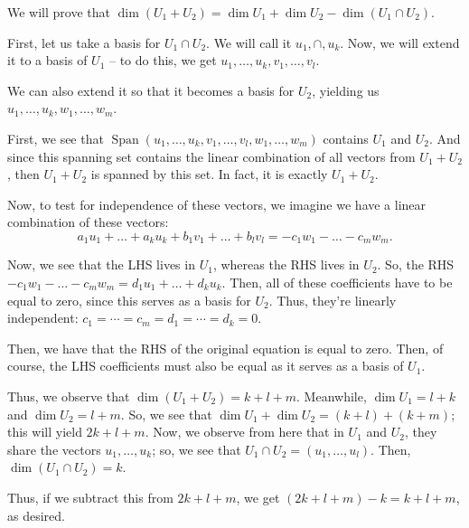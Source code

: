 \documentclass[openany]{book}
\DeclareMathOperator*{\Span}{Span}
\begin{document}
\begin{rmk}
	We will prove that $\dim (U_{1} + U_{2}) = \dim U_{1} + \dim U_{2} - \dim (U_{1} \cap U_{2})$.
	
	First, let us take a basis for $U_{1} \cap U_{2}$. We will call it $u_{1}, \cap, u_{k}$. Now, we will extend it to a basis of $U_{1}$ -- to do this, we get $u_{1}, \ldots, u_{k}, v_{1}, \ldots, v_{l}$.
	
	We can also extend it so that it becomes a basis for $U_{2}$, yielding us $u_{1}, \ldots, u_{k}, w_{1}, \ldots, w_{m}$.
	
	First, we see that $\Span (u_{1}, \ldots, u_{k}, v_{1}, \ldots, v_{l}, w_{1}, \ldots, w_{m})$ contains $U_{1}$ and $U_{2}$. And since this spanning set contains the linear combination of all vectors from $U_{1} + U_{2}$, then $U_{1} + U_{2}$ is spanned by this set. In fact, it is exactly $U_{1} + U_{2}$.
	
	Now, to test for independence of these vectors, we imagine we have a linear combination of these vectors:
	\begin{equation*}
		a_{1}u_{1} + \ldots + a_{k}u_{k} + b_{1}v_{1} + \ldots + b_{l}v_{l} = -c_{1}w_{1} - \ldots - c_{m}w_{m}.
	\end{equation*}

	Now, we see that the LHS lives in $U_{1}$, whereas the RHS lives in $U_{2}$. So, the RHS $-c_{1}w_{1} - \ldots - c_{m}w_{m} = d_{1}u_{1}+ \ldots + d_{k}u_{k}$. Then, all of these coefficients have to be equal to zero, since this serves as a basis for $U_{2}$. Thus, they're linearly independent: $c_{1} = \cdots = c_{m} = d_{1} = \cdots = d_{k} = 0$. 
	
	Then, we have that the RHS of the original equation is equal to zero. Then, of course, the LHS coefficients must also be equal as it serves as a basis of $U_{1}$.
	
	Thus, we observe that $\dim (U_{1} + U_{2}) = k + l + m$. Meanwhile, $\dim U_{1} = l + k$ and $\dim U_{2} = l + m$. So, we see that $\dim U_{1} + \dim U_{2} = (k + l) + (k + m)$; this will yield $2k + l + m$. Now, we observe from here that in $U_{1}$ and $U_{2}$, they share the vectors $u_{1}, \ldots, u_{k}$; so, we see that $U_{1} \cap U_{2} = (u_{1}, \ldots, u_{l})$. Then, $\dim (U_{1} \cap U_{2}) = k$.
	
	Thus, if we subtract this from $2k + l + m$, we get $(2k + l + m) - k = k + l + m$, as desired.
\end{rmk}
\end{document}
